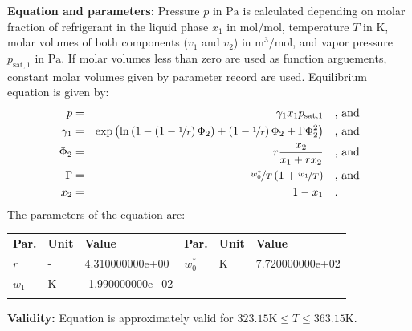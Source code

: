 \textbf{Equation and parameters:}
\newline
%
Pressure $p$ in $\si{\pascal}$ is calculated depending on molar fraction of refrigerant in the liquid phase $x_1$ in $\si{\mole\per\mole}$, temperature $T$ in $\si{\kelvin}$, molar volumes of both components ($v_1$ and $v_2$) in $\si{\cubic\meter\per\mole}$, and vapor pressure $p_\mathrm{sat,1}$ in $\si{\pascal}$. If molar volumes less than zero are used as function arguements, constant molar volumes given by parameter record are used. Equilibrium equation is given by:
%
\begin{equation*}
\begin{split}
p &=& \gamma_1 x_1 p_\mathrm{sat,1} & \quad\text{, and} \\
\gamma_1 &=& \exp \left( \ln \left( 1 - \left( 1 - \nicefrac{1}{r} \right) \Phi_2  \right) + \left(1 - \nicefrac{1}{r}\right) \Phi_2 + \Gamma \Phi_2 ^2 \right) & \quad\text{, and} \\
\Phi_2 &=& r \frac{x_2}{x_1 + r x_2} & \quad\text{, and} \\
\Gamma &=& \nicefrac{w_0^{*}}{T} \left( 1 + \nicefrac{w_1}{T} \right) & \quad\text{, and} \\
x_2 &=& 1 - x_1  & \quad\text{.} \\
\end{split}
\end{equation*}
%
The parameters of the equation are:
%
\begin{longtable}[l]{lll|lll}
\toprule
\addlinespace
\textbf{Par.} & \textbf{Unit} & \textbf{Value} &	\textbf{Par.} & \textbf{Unit} & \textbf{Value} \\
\addlinespace
\midrule
\endhead

\bottomrule
\endfoot
\bottomrule
\endlastfoot
\addlinespace

$r$ & - & 4.310000000e+00 & $w_0^{*}$ & $\si{\kelvin}$ & 7.720000000e+02 \\
$w_1$ & $\si{\kelvin}$ & -1.990000000e+02 & & & \\

\addlinespace\end{longtable}

\textbf{Validity:}
\newline
Equation is approximately valid for $323.15 \si{\kelvin} \leq T \leq 363.15 \si{\kelvin}$.
\newline

